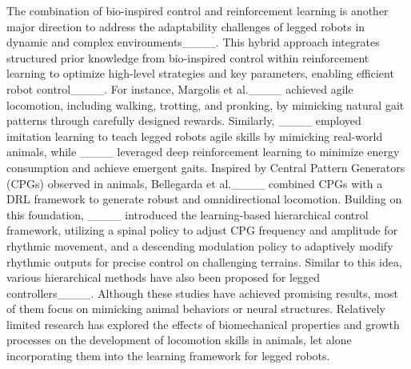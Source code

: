 The combination of bio-inspired control and reinforcement learning is another major direction to address the adaptability challenges of legged robots in dynamic and complex environments____.
This hybrid approach integrates structured prior knowledge from bio-inspired control within reinforcement learning to optimize high-level strategies and key parameters, enabling efficient robot control____. For instance, Margolis et al.____ achieved agile locomotion, including walking, trotting, and pronking, by mimicking natural gait patterns through carefully designed rewards.
Similarly, ____ employed imitation learning to teach legged robots agile skills by mimicking real-world animals, while ____ leveraged deep reinforcement learning to minimize energy consumption and achieve emergent gaits.
Inspired by Central Pattern Generators (CPGs) observed in animals, Bellegarda et al.____ combined CPGs with a DRL framework to generate robust and omnidirectional locomotion.
Building on this foundation, ____ introduced the learning-based hierarchical control framework, utilizing a spinal policy to adjust CPG frequency and amplitude for rhythmic movement, and a descending modulation policy to adaptively modify rhythmic outputs for precise control on challenging terrains.
Similar to this idea, various hierarchical methods have also been proposed for legged controllers____. 
Although these studies have achieved promising results, most of them focus on mimicking animal behaviors or neural structures. Relatively limited research has explored the effects of biomechanical properties and growth processes on the development of locomotion skills in animals, let alone incorporating them into the learning framework for legged robots.
